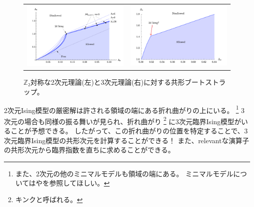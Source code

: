\documentclass[\main/main.tex]{subfiles}
\begin{document}
\begin{figure}[H]
    \centering
    \begin{tabular}{cc}
        \begin{minipage}[b]{0.45\hsize}
            \includegraphics[width=\hsize]{../images/bootstrap_2dising.png}
        \end{minipage}
        &
        \begin{minipage}[b]{0.45\hsize}
            \includegraphics[width=\hsize]{../images/bootstrap_3dising.png}
        \end{minipage}
    \end{tabular}
    \caption{
        $ℤ₂$対称な2次元理論(左)と3次元理論(右)に対する共形ブートストラップ。
    }
\end{figure}
2次元Ising模型の厳密解は許される領域の端にある折れ曲がりの上にいる。
\footnote{
    また、2次元の他のミニマルモデルも領域の端にある。
    ミニマルモデルについては\cite{Hikita_2020}や\cite{francesco2012conformal}を参照してほしい。
}
3次元の場合も同様の振る舞いが見られ、折れ曲がり
\footnote{
    キンクと呼ばれる。
}
に3次元臨界Ising模型がいることが予想できる。
したがって、この折れ曲がりの位置を特定することで、3次元臨界Ising模型の共形次元を計算することができる！
また、relevantな演算子の共形次元から臨界指数を直ちに求めることができる。
\end{document}
